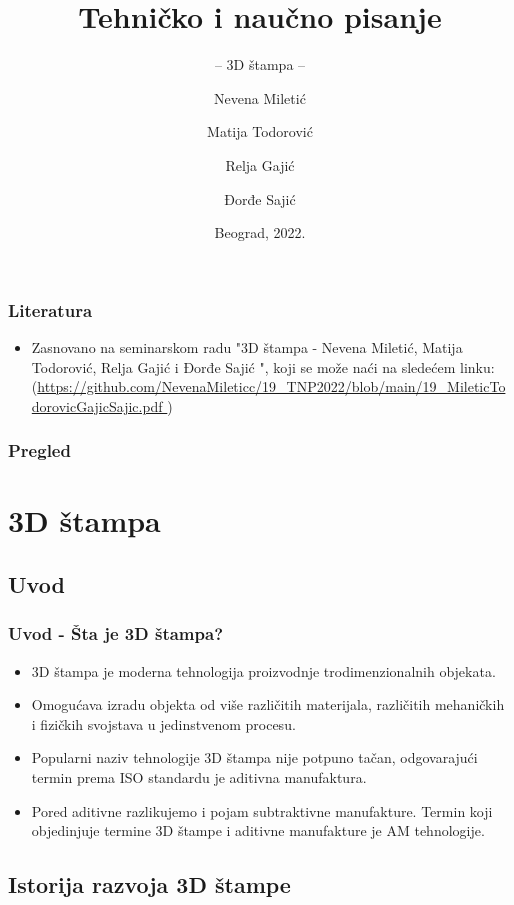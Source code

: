 \documentclass{beamer}
\title{Tehničko i naučno pisanje}
\subtitle{-- 3D štampa --}
\author{Nevena Miletić\and Matija Todorović\\ \and Relja Gajić \and Đorđe Sajić}
\institute{Matematički fakultet\\Univerzitet u Beogradu}
\date{
	\footnotesize{Beograd, 2022.}	
}
\begin{document}
\begin{frame}
	\thispagestyle{empty}
	\titlepage
\end{frame}

\addtocounter{framenumber}{-1}

\begin{frame}[fragile]\frametitle{Literatura}
	\begin{itemize}
		\item Zasnovano na seminarskom radu "3D štampa - Nevena Miletić, Matija Todorović, Relja Gajić i Đorđe Sajić ", koji se može naći na sledećem linku:
		(\url{https://github.com/NevenaMileticc/19_TNP2022/blob/main/19_MileticTodorovicGajicSajic.pdf })
	\end{itemize}
\end{frame}

\begin{frame}
	\frametitle{Pregled} 
	\tableofcontents[] 
\end{frame}
\section{3D štampa}
\subsection{Uvod}

\begin{frame}[fragile]\frametitle{Uvod - Šta je 3D štampa?}
	\begin{itemize}
	    \item 3D štampa je moderna tehnologija proizvodnje trodimenzionalnih objekata. 
            \item Omogućava izradu objekta od više različitih materijala, različitih mehaničkih i fizičkih svojstava u jedinstvenom procesu. 
            \item Popularni naziv tehnologije 3D štampa nije potpuno tačan, odgovarajući termin prema ISO standardu je aditivna manufaktura. 
            \item Pored aditivne razlikujemo i pojam subtraktivne manufakture.
Termin koji objedinjuje termine 3D štampe i aditivne manufakture je AM tehnologije. 
	\end{itemize}
\end{frame}

\subsection{Istorija razvoja 3D štampe}
\end{document}
